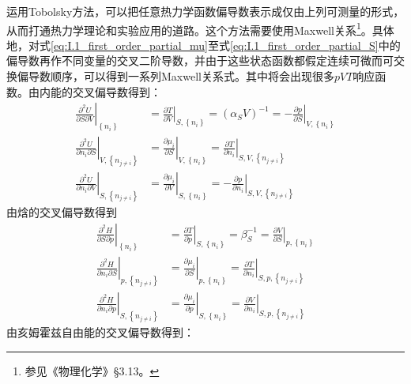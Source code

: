 \documentclass[main.tex]{subfiles}
\begin{document}
运用Tobolsky方法\cite{Tobolsky1942}，可以把任意热力学函数偏导数表示成仅由上列可测量的形式，从而打通热力学理论和实验应用的道路。这个方法需要使用Maxwell关系\footnote{参见《物理化学》\S 3.13。}。具体地，对式\eqref{eq:I.1_first_order_partial_mu}至式\eqref{eq:I.1_first_order_partial_S}中的偏导数再作不同变量的交叉二阶导数，并由于这些状态函数都假定连续可微而可交换偏导数顺序，可以得到一系列Maxwell关系式。其中将会出现很多$pVT$响应函数。由内能的交叉偏导数得到：
\begin{align}
    \left.\frac{\partial^2 U}{\partial S\partial V}\right|_{\left\{n_i\right\}}             & =\left.\frac{\partial T}{\partial V}\right|_{S,\left\{n_i\right\}}=\left(\alpha_S V\right)^{-1}=-\left.\frac{\partial p}{\partial S}\right|_{V,\left\{n_i\right\}}\label{eq:I.1_Maxwell_USV} \\
    \left.\frac{\partial ^2U}{\partial n_i\partial S}\right|_{V,\left\{n_{j\neq i}\right\}} & =\left.\frac{\partial \mu_i}{\partial S}\right|_{V,\left\{n_i\right\}}=\left.\frac{\partial T}{\partial n_i}\right|_{S,V,\left\{n_{j\neq i}\right\}}\label{eq:I.1_Maxwell_UnS}               \\
    \left.\frac{\partial ^2U}{\partial n_i\partial V}\right|_{S,\left\{n_{j\neq i}\right\}} & =\left.\frac{\partial \mu_i}{\partial V}\right|_{S,\left\{n_i\right\}}=-\left.\frac{\partial p}{\partial n_i}\right|_{S,V,\left\{n_{j\neq i}\right\}}\label{eq:I.1_Maxwell_UnV}
\end{align}
由焓的交叉偏导数得到
\begin{align}
    \left.\frac{\partial^2 H}{\partial S\partial p}\right|_{\left\{n_i\right\}}             & =\left.\frac{\partial T}{\partial p}\right|_{S,\left\{n_i\right\}}=\beta_S^{-1}=\left.\frac{\partial V}{\partial S}\right|_{p,\left\{n_i\right\}}\label{eq:I.1_Maxwell_HSp}    \\
    \left.\frac{\partial ^2H}{\partial n_i\partial S}\right|_{p,\left\{n_{j\neq i}\right\}} & =\left.\frac{\partial \mu_i}{\partial S}\right|_{p,\left\{n_i\right\}}=\left.\frac{\partial T}{\partial n_i}\right|_{S,p,\left\{n_{j\neq i}\right\}}\label{eq:I.1_Maxwell_HnS} \\
    \left.\frac{\partial ^2H}{\partial n_i\partial p}\right|_{S,\left\{n_{j\neq i}\right\}} & =\left.\frac{\partial \mu_i}{\partial p}\right|_{S,\left\{n_i\right\}}=\left.\frac{\partial V}{\partial n_i}\right|_{S,p,\left\{n_{j\neq i}\right\}}\label{eq:I.1_Maxwell_Hnp}
\end{align}
由亥姆霍兹自由能的交叉偏导数得到：
\end{document}
